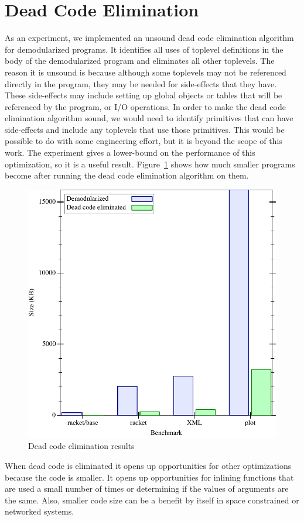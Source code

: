 \section{Dead Code Elimination}
As an experiment, we implemented an unsound dead code elimination algorithm for demodularized programs.
It identifies all uses of toplevel definitions in the body of the demodularized program and eliminates all other toplevels.
The reason it is unsound is because although some toplevels may not be referenced directly in the program, they may be needed for side-effects that they have.
These side-effects may include setting up global objects or tables that will be referenced by the program, or I/O operations.
In order to make the dead code elimination algorithm sound, we would need to identify primitives that can have side-effects and include any toplevels that use those primitives.
This would be possible to do with some engineering effort, but it is beyond the scope of this work. 
The experiment gives a lower-bound on the performance of this optimization, so it is a useful result.
Figure~\ref{fig:dead-code} shows how much smaller programs become after running the dead code elimination algorithm on them.
\begin{figure}
\includegraphics[width=.8\textwidth]{figures/gc-results}
\caption{Dead code elimination results}
\label{fig:dead-code}
\end{figure}
When dead code is eliminated it opens up opportunities for other optimizations because the code is smaller.
It opens up opportunities for inlining functions that are used a small number of times or determining if the values of arguments are the same.
Also, smaller code size can be a benefit by itself in space constrained or networked systems.

